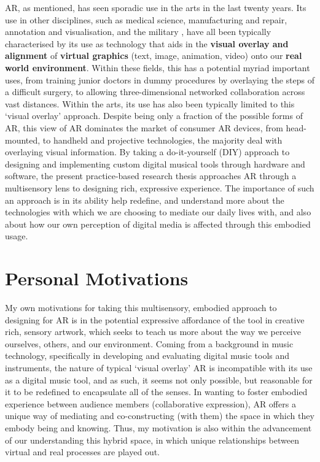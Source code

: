 AR, as mentioned, has seen sporadic use in the arts in the last twenty years. Its use in other disciplines, such as medical science, manufacturing and repair, annotation and visualisation, and the military \citep{azuma1997}, have all been typically characterised by its use as technology that aids in the \textbf{visual overlay and alignment} of \textbf{virtual graphics} (text, image, animation, video) onto our \textbf{real world environment}. Within these fields, this has a potential myriad important uses, from training junior doctors in dummy procedures by overlaying the steps of a difficult surgery, to allowing three-dimensional networked collaboration across vast distances. Within the arts, its use has also been typically limited to this `visual overlay' approach. Despite being only a fraction of the possible forms of AR, this view of AR dominates the market of consumer AR devices, from head-mounted, to handheld and projective technologies, the majority deal with overlaying visual information.  By taking a do-it-yourself (DIY) approach to designing and implementing custom digital musical tools through hardware and software, the present practice-based research thesis approaches AR through a multisensory lens to designing rich, expressive experience. The importance of such an approach is in its ability help redefine, and understand more about the technologies with which we are choosing to mediate our daily lives with, and also about how our own perception of digital media is affected through this embodied usage. 



\section{Personal Motivations}\label{sec: introduction-motivations}
My own motivations for taking this multisensory, embodied approach to designing for AR is in the potential expressive affordance of the tool in creative rich, sensory artwork, which seeks to teach us more about the way we perceive ourselves, others, and our environment. Coming from a background in music technology, specifically in developing and evaluating digital music tools and instruments, the nature of typical `visual overlay' AR is incompatible with its use as a digital music tool, and as such, it seems not only possible, but reasonable for it to be redefined to encapsulate all of the senses. In wanting to foster embodied experience between audience members (collaborative expression), AR offers a unique way of mediating and co-constructing (with them) the space in which they embody being and knowing. Thus, my motivation is also within the advancement of our understanding this hybrid space, in which unique relationships between virtual and real processes are played out.



